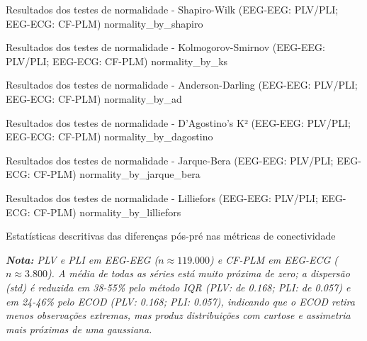 \clearpage
{}
{Resultados dos testes de normalidade - Shapiro-Wilk (EEG-EEG: PLV/PLI; EEG-ECG: CF-PLM)}
{normality_by_shapiro}


{Resultados dos testes de normalidade - Kolmogorov-Smirnov (EEG-EEG: PLV/PLI; EEG-ECG: CF-PLM)}
{normality_by_ks}


{Resultados dos testes de normalidade - Anderson-Darling (EEG-EEG: PLV/PLI; EEG-ECG: CF-PLM)}
{normality_by_ad}


{Resultados dos testes de normalidade - D'Agostino's K² (EEG-EEG: PLV/PLI; EEG-ECG: CF-PLM)}
{normality_by_dagostino}


{Resultados dos testes de normalidade - Jarque-Bera (EEG-EEG: PLV/PLI; EEG-ECG: CF-PLM)}
{normality_by_jarque_bera}


{Resultados dos testes de normalidade - Lilliefors (EEG-EEG: PLV/PLI; EEG-ECG: CF-PLM)}
{normality_by_lilliefors}

\begin{table}[!ht]
  \centering
  \caption{Estatísticas descritivas das diferenças pós-pré nas métricas de conectividade}
  \label{tab:descriptive_stats}
  \begin{adjustbox}{width=\textwidth}
    \small
    
  \end{adjustbox}

  \vspace{0.5em}
  \footnotesize\itshape
  \textbf{Nota:} PLV e PLI em EEG-EEG ($n\approx119.000$) e CF-PLM em EEG-ECG ($n\approx3.800$). A média de todas as séries está muito próxima de zero; a dispersão (\textit{std}) é reduzida em 38-55\% pelo método IQR (PLV: de 0.168; PLI: de 0.057) e em 24-46\% pelo ECOD (PLV: 0.168; PLI: 0.057), indicando que o ECOD retira menos observações extremas, mas produz distribuições com curtose e assimetria mais próximas de uma gaussiana.
  \normalsize
\end{table}